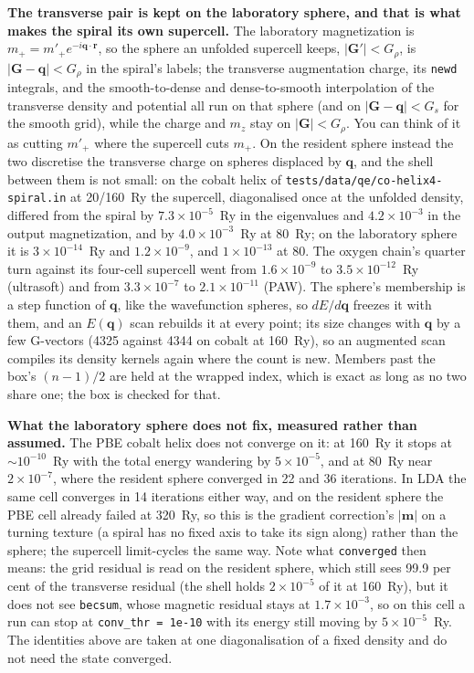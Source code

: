 \documentclass[11pt,a4paper]{article}
\newcommand{\code}[1]{\texttt{\small #1}}
\begin{document}
\textbf{The transverse pair is kept on the laboratory sphere, and that is what
makes the spiral its own supercell.} The laboratory magnetization is
$m_+ = m'_+ e^{-i\mathbf q\cdot\mathbf r}$, so the sphere an unfolded supercell
keeps, $|\mathbf G'| < G_\rho$, is $|\mathbf G - \mathbf q| < G_\rho$ in the
spiral's labels; the transverse augmentation charge, its \code{newd} integrals,
and the smooth-to-dense and dense-to-smooth interpolation of the transverse
density and potential all run on that sphere (and on $|\mathbf G - \mathbf q| <
G_s$ for the smooth grid), while the charge and $m_z$ stay on $|\mathbf G| <
G_\rho$. You can think of it as cutting $m'_+$ where the supercell cuts $m_+$.
On the resident sphere instead the two discretise the transverse charge on
spheres displaced by $\mathbf q$, and the shell between them is not small: on
the cobalt helix of \code{tests/data/qe/co-helix4-spiral.in} at 20/160~Ry the
supercell, diagonalised once at the unfolded density, differed from the spiral
by $7.3\times10^{-5}$~Ry in the eigenvalues and $4.2\times10^{-3}$ in the
output magnetization, and by $4.0\times10^{-3}$~Ry at 80~Ry; on the laboratory
sphere it is $3\times10^{-14}$~Ry and $1.2\times10^{-9}$, and $1\times10^{-13}$
at 80. The oxygen chain's quarter turn against its four-cell supercell went from
$1.6\times10^{-9}$ to $3.5\times10^{-12}$~Ry (ultrasoft) and from
$3.3\times10^{-7}$ to $2.1\times10^{-11}$ (PAW). The sphere's membership is a
step function of $\mathbf q$, like the wavefunction spheres, so
$dE/d\mathbf q$ freezes it with them, and an $E(\mathbf q)$ scan rebuilds it at
every point; its size changes with $\mathbf q$ by a few G-vectors (4325 against
4344 on cobalt at 160~Ry), so an augmented scan compiles its density kernels
again where the count is new. Members past the box's $(n-1)/2$ are held at the
wrapped index, which is exact as long as no two share one; the box is checked
for that.

\textbf{What the laboratory sphere does not fix, measured rather than assumed.}
The PBE cobalt helix does not converge on it: at 160~Ry it stops at
$\sim10^{-10}$~Ry with the total energy wandering by $5\times10^{-5}$, and at
80~Ry near $2\times10^{-7}$, where the resident sphere converged in 22 and 36
iterations. In LDA the same cell converges in 14 iterations either way, and on
the resident sphere the PBE cell already failed at 320~Ry, so this is the
gradient correction's $|\mathbf m|$ on a turning texture (a spiral has no fixed
axis to take its sign along) rather than the sphere; the supercell limit-cycles
the same way. Note what \code{converged} then means: the grid residual is read
on the resident sphere, which still sees 99.9 per cent of the transverse
residual (the shell holds $2\times10^{-5}$ of it at 160~Ry), but it does not see
\code{becsum}, whose magnetic residual stays at $1.7\times10^{-3}$, so on this
cell a run can stop at \code{conv\_thr = 1e-10} with its energy still moving
by $5\times10^{-5}$~Ry. The identities above are taken at one diagonalisation
of a fixed density and do not need the state converged.
\end{document}
